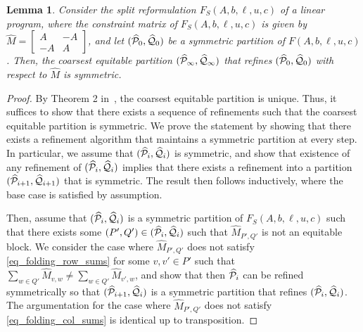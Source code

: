 \documentclass[pdflatex,sn-mathphys-num]{sn-jnl}%
\theoremstyle{thmstyleone}%
\newtheorem{lemma}[lemma]{Lemma}
\theoremstyle{thmstylethree}%
\theoremstyle{thmstyletwo}%
\begin{document}
\begin{lemma}
\label{thm_refinement_symmetric}
    Consider the split reformulation $F_S(A,b,\ell,u,c)$ of a linear program, where the constraint matrix of $F_S(A,b,\ell,u,c)$ is given by $\widehat{M} = \begin{bmatrix}
        A & - A\\
        -A & A
    \end{bmatrix}$, and let $(\widehat{\mathcal{P}}_0,\widehat{\mathcal{Q}}_0)$ be a symmetric partition of $F(A,b,\ell,u,c)$. Then, the coarsest equitable partition $(\widehat{\mathcal{P}}_\infty,\widehat{\mathcal{Q}}_\infty)$ that refines $(\widehat{\mathcal{P}}_0,\widehat{\mathcal{Q}}_0)$ with respect to $\widehat{M}$ is symmetric.
\end{lemma}
\begin{proof}

    By Theorem 2 in~\cite{Paige1987}, the coarsest equitable partition is unique. Thus, it suffices to show that there exists a sequence of refinements such that the coarsest equitable partition is symmetric. 
    We prove the statement by showing that there exists a refinement algorithm that maintains a symmetric partition at every step. In particular, we assume that $(\widehat{\mathcal{P}}_i,\widehat{\mathcal{Q}}_i)$ is symmetric, and show that existence of any refinement of $(\widehat{\mathcal{P}}_i,\widehat{\mathcal{Q}}_i)$ implies that there exists a refinement into a partition $(\widehat{\mathcal{P}}_{i+1},\widehat{\mathcal{Q}}_{i+1})$ that is symmetric. The result then follows inductively, where the base case is satisfied by assumption.

    Then, assume that $(\widehat{\mathcal{P}}_i,\widehat{\mathcal{Q}}_i)$ is a symmetric partition of $F_S(A,b,\ell,u,c)$ such that there exists some $(P',Q') \in (\widehat{\mathcal{P}}_i,\widehat{\mathcal{Q}}_i)$ such that $\widehat{M}_{P',Q'}$ is not an equitable block. 
    We consider the case where $\widehat{M}_{P',Q'}$ does not satisfy \eqref{eq_folding_row_sums} for some $v,v'\in P'$ such that $\sum_{w\in Q'} \widehat{M}_{v,w} \neq \sum_{w\in Q'} \widehat{M}_{v',w}$, and show that then $\widehat{\mathcal{P}}_i$ can be refined symmetrically so that $(\widehat{\mathcal{P}}_{i+1},\widehat{\mathcal{Q}}_i)$ is a symmetric partition that refines $(\widehat{\mathcal{P}}_i,\widehat{\mathcal{Q}}_i)$. The argumentation for the case where $\widehat{M}_{P',Q'}$ does not satisfy \eqref{eq_folding_col_sums} is identical up to transposition. 


\end{proof}
\end{document}
